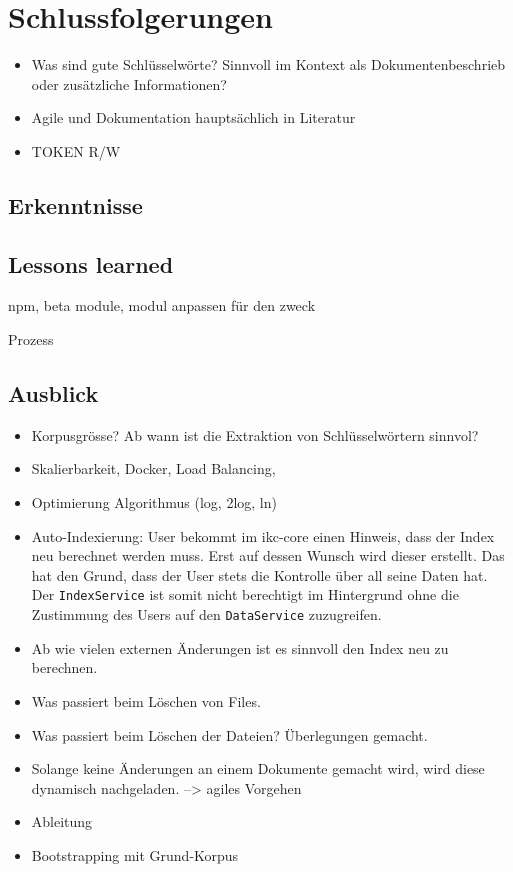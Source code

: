 \chapter{Schlussfolgerungen}

\begin{itemize}
    \item Was sind gute Schlüsselwörte? Sinnvoll im Kontext als Dokumentenbeschrieb oder zusätzliche Informationen?
    \item Agile und Dokumentation hauptsächlich in Literatur
    \item TOKEN R/W
\end{itemize}

\section{Erkenntnisse}

\section{Lessons learned}

npm, beta module, modul anpassen für den zweck

Prozess

\section{Ausblick}

\begin{itemize}
    \item Korpusgrösse? Ab wann ist die Extraktion von Schlüsselwörtern sinnvol?
    \item Skalierbarkeit, Docker, Load Balancing, 
    \item Optimierung Algorithmus (log, 2log, ln)
    \item Auto-Indexierung: User bekommt im \gls{ikc-core} einen Hinweis, dass der Index neu berechnet werden muss. Erst auf dessen Wunsch wird dieser erstellt. Das hat den Grund, dass der User stets die Kontrolle über all seine Daten hat. Der \texttt{IndexService} ist somit nicht berechtigt im Hintergrund ohne die Zustimmung des Users auf den \texttt{DataService} zuzugreifen.
    \item Ab wie vielen externen Änderungen ist es sinnvoll den Index neu zu berechnen.
    \item Was passiert beim Löschen von Files.
    \item Was passiert beim Löschen der Dateien? Überlegungen gemacht.
    \item Solange keine Änderungen an einem Dokumente gemacht wird, wird diese dynamisch nachgeladen. --> agiles Vorgehen
    \item Ableitung
    \item Bootstrapping mit Grund-Korpus
\end{itemize}